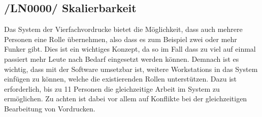 \subsection{/LN0000/ Skalierbarkeit}
Das System der Vierfachvordrucke bietet die Möglichkeit, dass auch mehrere Personen eine Rolle übernehmen, also dass es zum Beispiel zwei oder mehr Funker gibt. Dies ist ein wichtiges Konzept, da so im Fall dass zu viel auf einmal passiert mehr Leute nach Bedarf eingesetzt werden können. Demnach ist es wichtig, dass mit der Software umsetzbar ist, weitere Workstations in das System einfügen zu können, welche die existierenden Rollen unterstützen. Dazu ist erforderlich, bis zu 11 Personen die gleichzeitige Arbeit im System zu ermöglichen. Zu achten ist dabei vor allem auf Konflikte bei der gleichzeitigen Bearbeitung von Vordrucken.